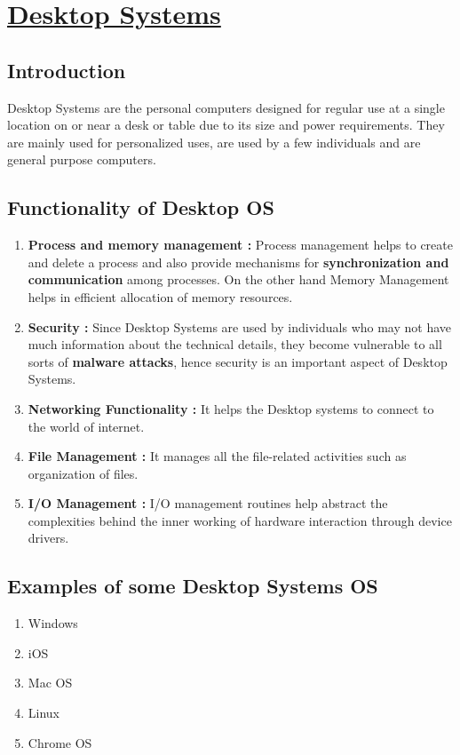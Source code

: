 \documentclass{article}
\begin{document}
      
       \fi
    
    \section{\underline{Desktop Systems}}  
    \subsection{Introduction}
     Desktop Systems are the personal computers designed for regular use at a single location on or near a desk or table due to its size and power requirements. They are mainly used for personalized uses, are used by a few individuals and are general purpose computers.
    \subsection{Functionality of Desktop OS}
    \begin{enumerate}
        \item \textbf{Process and memory management :} Process management helps to create and delete a process and also provide mechanisms for \textbf{synchronization and communication} among processes. On the other hand Memory Management helps in efficient allocation of memory resources.
        
        \item \textbf{Security :} Since Desktop Systems are used by individuals who may not have much information about the technical details, they become vulnerable to all sorts of \textbf{malware attacks}, hence security is an important aspect of Desktop Systems.
        
        \item \textbf{Networking Functionality :} It helps the Desktop systems to connect to the world of internet.
        
        \item \textbf{File Management :} It manages all the file-related activities such as organization  of files.
        
        \item \textbf{I/O Management :} I/O management routines help abstract the complexities behind the inner working of hardware interaction through device drivers. 
    \end{enumerate}
    \subsection{Examples of some Desktop Systems OS}
     \begin{enumerate}
         \item Windows
         \item iOS
         \item Mac OS
         \item Linux
         \item Chrome OS
     \end{enumerate}
\end{document}
